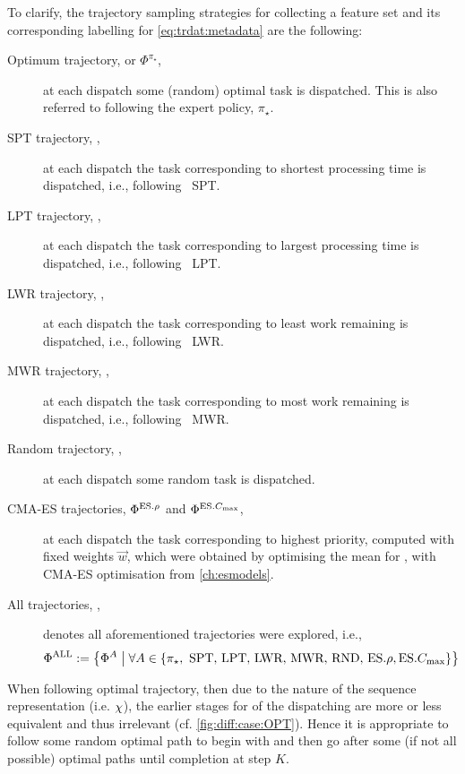 \clearpage
To clarify, the trajectory sampling strategies for collecting a feature set and 
its corresponding labelling for \cref{eq:trdat:metadata} are the following:
\begin{description}
    \item[Optimum trajectory,  or $\Phi^{\pi_\star}$,] at each 
    dispatch some (random) optimal task is dispatched. This is also referred to 
    following the expert policy, $\pi_\star$.
    \item[SPT trajectory, ,] at each dispatch the task 
    corresponding to shortest processing time is dispatched, i.e., following 
    \sdr~SPT.
    \item[LPT trajectory, ,] at each dispatch the task 
    corresponding to largest processing time is dispatched, i.e., following 
    \sdr~LPT.
    \item[LWR trajectory, ,] at each dispatch the task 
    corresponding to least work remaining is dispatched, i.e., following 
    \sdr~LWR.
    \item[MWR trajectory, ,] at each dispatch the task 
    corresponding to most work remaining is dispatched, i.e., following 
    \sdr~MWR.
    \item[Random trajectory, ,] at each dispatch some random task 
    is dispatched.
    \item[CMA-ES trajectories, $\Phi^{\text{ES}.{\rho}}$ and $\Phi^{\text{ES}.{C_{\max}}}$,] at each 
    dispatch the task  corresponding to highest priority, computed with fixed 
    weights $\vec{w}$, which were obtained by optimising the mean for 
    \fullnamerho, with CMA-ES optimisation from \cref{ch:esmodels}. 
    \item[All trajectories, ,] denotes all aforementioned 
    trajectories were explored, i.e., \vspace*{-18pt}
    \begin{equation} \nonumber
    \Phi^{\text{ALL}}:=\left\{\Phi^{A}\;\middle|\;\forall A \in 
    \left\{\pi_\star,\text{~SPT,~LPT,~LWR,~MWR,~RND,~}\text{ES}.{\rho},\text{ES}.{C_{\max}}\right\}\right\}
    \end{equation}
\end{description}

When following optimal trajectory, then due to the nature of the sequence 
representation (i.e. ${\mathbf{\chi}}$), the earlier stages for  of the 
dispatching are more or less equivalent and thus irrelevant (cf. 
\cref{fig:diff:case:OPT}). 
Hence it is appropriate to follow some random optimal path to begin with and 
then go after some (if not all possible) optimal paths until completion at step 
$K$. 

